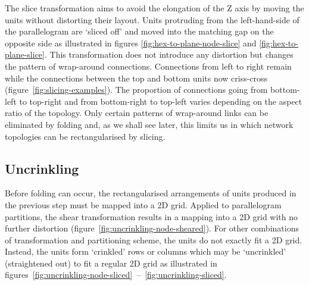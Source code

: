 			The slice transformation aims to avoid the elongation of the Z axis by
			moving the units without distorting their layout. Units protruding from
			the left-hand-side of the parallelogram are `sliced off' and moved into
			the matching gap on the opposite side as illustrated in figures
			\ref{fig:hex-to-plane-node-slice} and \ref{fig:hex-to-plane-slice}. This
			transformation does not introduce any distortion but changes the pattern
			of wrap-around connections. Connections from left to right remain while
			the connections between the top and bottom units now criss-cross
			(figure~\ref{fig:slicing-examples}).  The proportion of connections going
			from bottom-left to top-right and from bottom-right to top-left varies
			depending on the aspect ratio of the topology. Only certain patterns of
			wrap-around links can be eliminated by folding and, as we shall see
			later, this limits us in which network topologies can be rectangularised
			by slicing.
			
		\subsection{Uncrinkling}
			
			Before folding can occur, the rectangularised arrangements of units
			produced in the previous step must be mapped into a 2D grid. Applied to
			parallelogram partitions, the shear transformation results in a mapping
			into a 2D grid with no further distortion
			(figure~\ref{fig:uncrinkling-node-sheared}). For other combinations of
			transformation and partitioning scheme, the units do not exactly fit a 2D
			grid. Instead, the units form `crinkled' rows or columns which may be
			`uncrinkled' (straightened out) to fit a regular 2D grid as illustrated in
			figures~\ref{fig:uncrinkling-node-sliced}~--~\ref{fig:uncrinkling-sliced}.
			
